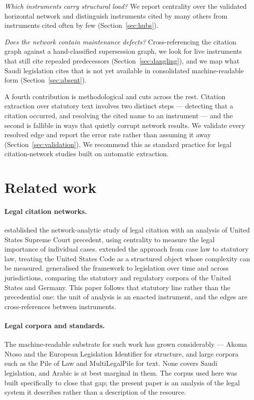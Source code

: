 \documentclass[sn-basic]{sn-jnl}%
\newcommand{\corpuscite}{anon2026corpus}
\newcommand{\corpuscite}{almohammedi2026corpus}
\begin{document}
\emph{Which instruments carry structural load?} We report centrality over
the validated horizontal network and distinguish instruments cited by many
others from instruments cited often by few (Section~\ref{sec:hubs}).

\emph{Does the network contain maintenance defects?} Cross-referencing the
citation graph against a hand-classified supersession graph, we look for
live instruments that still cite repealed predecessors
(Section~\ref{sec:dangling}), and we map what Saudi legislation cites that
is not yet available in consolidated machine-readable form
(Section~\ref{sec:absent}).

A fourth contribution is methodological and cuts across the rest. Citation
extraction over statutory text involves two distinct steps --- detecting
that a citation occurred, and resolving the cited name to an instrument ---
and the second is fallible in ways that quietly corrupt network results. We
validate every resolved edge and report the error rate rather than assuming
it away (Section~\ref{sec:validation}). We recommend this as standard
practice for legal citation-network studies built on automatic extraction.

\section{Related work}
\label{sec:related}

\paragraph{Legal citation networks.}
\citet{fowler2007network} established the network-analytic study of legal
citation with an analysis of United States Supreme Court precedent, using
centrality to measure the legal importance of individual cases.
\citet{katz2014complexity} extended the approach from case law to statutory
law, treating the United States Code as a structured object whose complexity
can be measured. \citet{coupette2021measuring} generalised the framework to
legislation over time and across jurisdictions, comparing the statutory and
regulatory corpora of the United States and Germany. This paper follows that
statutory line rather than the precedential one: the unit of analysis is an
enacted instrument, and the edges are cross-references between instruments.

\paragraph{Legal corpora and standards.}
The machine-readable substrate for such work has grown considerably ---
Akoma Ntoso \citep{palmirani2011akoma} and the European Legislation
Identifier for structure, and large corpora such as the Pile of Law
\citep{henderson2022pileoflaw} and MultiLegalPile
\citep{niklaus2024multilegalpile} for text. None covers Saudi legislation,
and Arabic is at best marginal in them. The corpus used here
\citep{\corpuscite} was built specifically to close that gap; the
present paper is an analysis of the legal system it describes rather than a
description of the resource.
\end{document}
